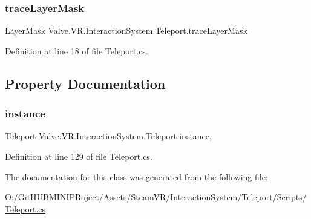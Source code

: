 \mbox{\label{class_valve_1_1_v_r_1_1_interaction_system_1_1_teleport_a8b86ab654345c478a2c06cf3cc14eca8}} 
\subsubsection{\texorpdfstring{traceLayerMask}{traceLayerMask}}
{\footnotesize\ttfamily Layer\+Mask Valve.\+V\+R.\+Interaction\+System.\+Teleport.\+trace\+Layer\+Mask}



Definition at line 18 of file Teleport.\+cs.



\subsection{Property Documentation}
\mbox{\label{class_valve_1_1_v_r_1_1_interaction_system_1_1_teleport_a46adf4ce0792e06c79053aa5b000c495}} 
\subsubsection{\texorpdfstring{instance}{instance}}
{\footnotesize\ttfamily \mbox{\hyperlink{class_valve_1_1_v_r_1_1_interaction_system_1_1_teleport}{Teleport}} Valve.\+V\+R.\+Interaction\+System.\+Teleport.\+instance\hspace{0.3cm}{\ttfamily [static]}, {\ttfamily [get]}}



Definition at line 129 of file Teleport.\+cs.



The documentation for this class was generated from the following file\+:\begin{DoxyCompactItemize}
\item 
O\+:/\+Git\+H\+U\+B\+M\+I\+N\+I\+P\+Roject/\+Assets/\+Steam\+V\+R/\+Interaction\+System/\+Teleport/\+Scripts/\mbox{\hyperlink{_teleport_8cs}{Teleport.\+cs}}\end{DoxyCompactItemize}
